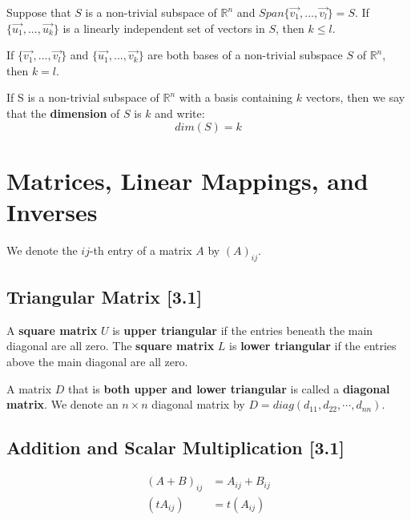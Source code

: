 \documentclass[a4paper,9pt]{extarticle}
\begin{document}
\begin{multicols*}{2}
Suppose that $S$ is a non-trivial subspace of $\mathbb{R}^n$ and $Span\{\vec{v_1}, ... ,\vec{v_l}\} = S$. If $\{\vec{u_1}, ... ,\vec{u_k}\}$ is a linearly independent set of vectors in $S$, then $k \leq l$.

If $\{\vec{v_1}, ... ,\vec{v_l}\}$ and $\{\vec{u_1}, ... ,\vec{v_k}\}$ are both bases of a non-trivial subspace $S$ of $\mathbb{R}^n$, then $k = l$.

If S is a non-trivial subspace of $\mathbb{R}^n$ with a basis containing $k$ vectors, then we say that the \textbf{dimension} of $S$ is $k$ and write:
$$dim(S) = k$$




\section{Matrices, Linear Mappings, and Inverses}
We denote the $ij$-th entry of a matrix $A$ by $(A)_{ij}$.


\subsection{Triangular Matrix [3.1]}
A \textbf{square matrix} $U$ is \textbf{upper triangular} if the entries beneath the main diagonal are all zero. The \textbf{square matrix} $L$ is \textbf{lower triangular} if the entries above the main diagonal are all zero.

A matrix $D$ that is \textbf{both upper and lower triangular} is called a \textbf{diagonal matrix}. We denote an $n \times n$ diagonal matrix by $D = diag(d_{11}, d_{22}, \cdots, d_{nn})$.


\subsection{Addition and Scalar Multiplication [3.1]}
\begin{equation} \label{3.1-1}
    \begin{split}
        (A + B)_{ij} & = A_{ij} + B_{ij} \\
        (t A_{ij}) & = t (A_{ij})
    \end{split}
\end{equation}


\end{multicols*}
\end{document}
